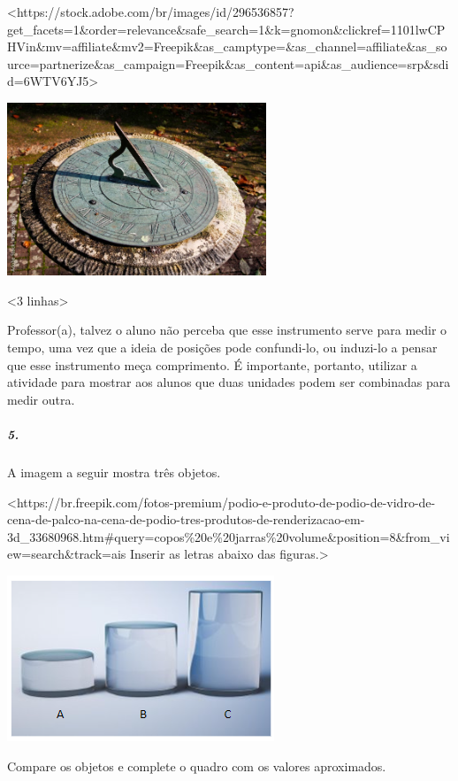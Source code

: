 \textless{}https://stock.adobe.com/br/images/id/296536857?get\_facets=1\&order=relevance\&safe\_search=1\&k=gnomon\&clickref=1101lwCPHVin\&mv=affiliate\&mv2=Freepik\&as\_camptype=\&as\_channel=affiliate\&as\_source=partnerize\&as\_campaign=Freepik\&as\_content=api\&as\_audience=srp\&sdid=6WTV6YJ5\textgreater{}

\includegraphics[width=3.05208in,height=2.03472in]{media/image45.jpeg}

\textless{}3 linhas\textgreater{}

Professor(a), talvez o aluno não perceba que esse instrumento serve para
medir o tempo, uma vez que a ideia de posições pode confundi-lo, ou
induzi-lo a pensar que esse instrumento meça comprimento. É importante,
portanto, utilizar a atividade para mostrar aos alunos que duas
unidades podem ser combinadas para medir outra.

\subparagraph{5.}\label{section-32}

A imagem a seguir mostra três objetos.

\textless{}https://br.freepik.com/fotos-premium/podio-e-produto-de-podio-de-vidro-de-cena-de-palco-na-cena-de-podio-tres-produtos-de-renderizacao-em-3d\_33680968.htm\#query=copos\%20e\%20jarras\%20volume\&position=8\&from\_view=search\&track=ais
Inserir as letras abaixo das figuras.\textgreater{}

\includegraphics[width=3.14583in,height=1.94792in]{media/image46.png}

Compare os objetos e complete o quadro com os valores aproximados.

